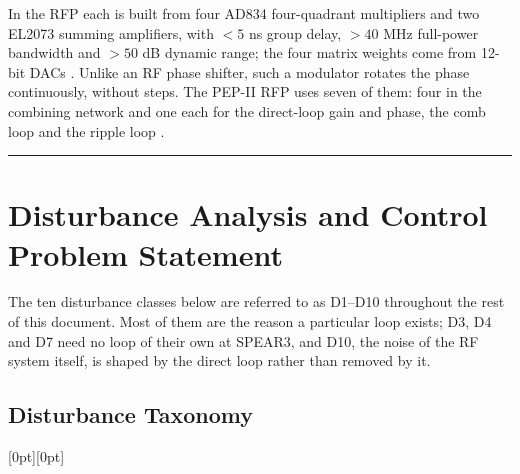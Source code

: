 In the RFP each is built from four AD834 four-quadrant multipliers  and two EL2073 summing amplifiers, with \(< 5\) ns group delay, \(> 40\) MHz full-power bandwidth and \(> 50\) dB dynamic range; the four matrix weights come from 12-bit DACs . Unlike an RF phase shifter, such a modulator rotates the phase continuously, without steps. The PEP-II RFP uses seven of them: four in the combining network and one each for the direct-loop gain and phase, the comb loop and the ripple loop .

\begin{center}\rule{0.5\linewidth}{0.5pt}\end{center}

\section{Disturbance Analysis and Control Problem Statement}\label{sec:disturbances}


The ten disturbance classes below are referred to as D1--D10 throughout the rest of this document. Most of them are the reason a particular loop exists; D3, D4 and D7 need no loop of their own at SPEAR3, and D10, the noise of the RF system itself, is shaped by the direct loop rather than removed by it.

\subsection{Disturbance Taxonomy}\label{sec:dist-taxonomy}
\raisebox{0pt}[0pt][0pt]{\hypertarget{dist:table}{}}


